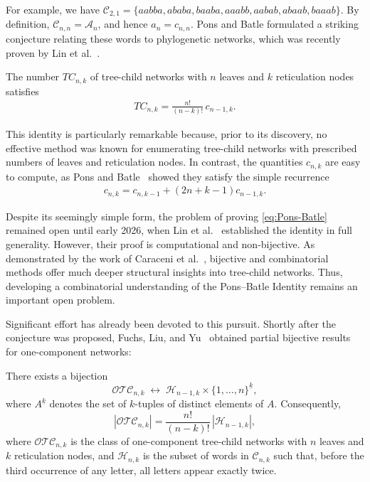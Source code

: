 \documentclass[a4paper,UKenglish,cleveref, autoref, thm-restate]{lipics-v2021}
\begin{document}
For example, we have
$
\mathcal{C}_{2,1} = \{aabba, ababa, baaba, aaabb, aabab, abaab, baaab\}.
$
By definition, $\mathcal{C}_{n,n} = \mathcal{A}_n$, and hence $a_n = c_{n,n}$. Pons and Batle formulated a striking conjecture relating these words to phylogenetic networks, which was recently proven by Lin et al.~\cite{linetall2026ProofPonsBatle}.

\begin{theorem}\label{thm:Pons-Batle}
The number $TC_{n,k}$ of tree-child networks with $n$ leaves and $k$ reticulation nodes satisfies
\begin{align}\label{eq:Pons-Batle}
TC_{n,k} = \frac{n!}{(n-k)!} \, c_{n-1,k}.
\end{align}
\end{theorem}

This identity is particularly remarkable because, prior to its discovery, no effective method was known for enumerating tree-child networks with prescribed numbers of leaves and reticulation nodes. In contrast, the quantities $c_{n,k}$ are easy to compute, as Pons and Batle~\cite{BatlePons2021Phylo} showed they satisfy the simple recurrence
\begin{align}
    \label{eq:reccnk}
    c_{n,k} = c_{n,k-1} + (2n+k-1)c_{n-1,k}.
\end{align}

Despite its seemingly simple form, the problem of proving \eqref{eq:Pons-Batle} remained open until early 2026, when Lin et al.~\cite{linetall2026ProofPonsBatle} established the identity in full generality. However, their proof is computational and non-bijective. As demonstrated by the work of Caraceni et al.~\cite{CARACENI2022112944}, bijective and combinatorial methods offer much deeper structural insights into tree-child networks. Thus, developing a combinatorial understanding of the Pons--Batle Identity remains an important open problem.

Significant effort has already been devoted to this pursuit. Shortly after the conjecture was proposed, Fuchs, Liu, and Yu~\cite{FuchsLiuYu2021Note} obtained partial bijective results for one-component networks:

\begin{proposition}\label{potc}
There exists a bijection
\[
\mathcal{OTC}_{n,k} \;\longleftrightarrow\; \mathcal{H}_{n-1,k} \times \{1, \dots, n\}^{\underline{k}},
\]
where $A^{\underline{k}}$ denotes the set of $k$-tuples of distinct elements of $A$. Consequently,
\[
|\mathcal{OTC}_{n,k}| = \frac{n!}{(n-k)!} \, |\mathcal{H}_{n-1,k}|,
\]
where $\mathcal{OTC}_{n,k}$ is the class of one-component tree-child networks with $n$ leaves and $k$ reticulation nodes, and $\mathcal{H}_{n,k}$ is the subset of words in $\mathcal{C}_{n,k}$ such that, before the third occurrence of any letter, all letters appear exactly twice.
\end{proposition}
\end{document}
